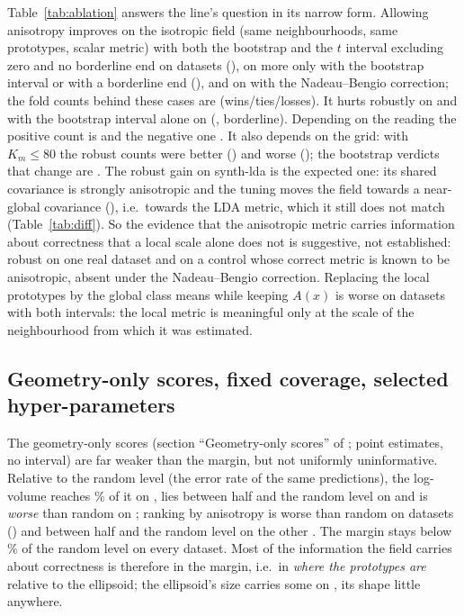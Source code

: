 \documentclass[10pt,a4paper]{article}
\theoremstyle{plain}
\theoremstyle{definition}
\theoremstyle{remark}
\begin{document}
Table~\ref{tab:ablation} answers the line's question in its narrow form. Allowing anisotropy improves on the isotropic field (same neighbourhoods, same prototypes, scalar metric) with both the bootstrap and the $t$ interval excluding zero and no borderline end on \AblAnisoIsoFirstRobust{} datasets (\AblAnisoIsoFirstRobustList), on \AblAnisoIsoFirstWeak{} more only with the bootstrap interval or with a borderline end (\AblAnisoIsoFirstWeakList), and on \AblAnisoIsoFirstNB{} with the Nadeau--Bengio correction; the fold counts behind these cases are \AblAnisoIsoWinsText{} (wins/ties/losses). It hurts robustly on \AblAnisoIsoSecondRobust{} and with the bootstrap interval alone on \AblAnisoIsoSecondWeak{} (\AblAnisoIsoSecondWeakList, borderline). Depending on the reading the positive count is \AblAnisoIsoFirstRange{} and the negative one \AblAnisoIsoSecondRange. It also depends on the grid: with $K_m\le80$ the robust counts were \VTwoAblAnisoIsoFirstRobust{} better (\VTwoAblAnisoIsoFirstRobustList) and \VTwoAblAnisoIsoSecondRobust{} worse (\VTwoAblAnisoIsoSecondRobustList); the bootstrap verdicts that change are \AblChangedList. The robust gain on synth-lda is the expected one: its shared covariance is strongly anisotropic and the tuning moves the field towards a near-global covariance (\SelSlda), i.e.\ towards the LDA metric, which it still does not match (Table~\ref{tab:diff}). So the evidence that the anisotropic metric carries information about correctness that a local scale alone does not is suggestive, not established: robust on one real dataset and on a control whose correct metric is known to be anisotropic, absent under the Nadeau--Bengio correction. Replacing the local prototypes by the global class means while keeping $A(x)$ is worse on \AblAnisoGprotoFirst{} datasets with both intervals: the local metric is meaningful only at the scale of the neighbourhood from which it was estimated.

\subsection{Geometry-only scores, fixed coverage, selected hyper-parameters}

The geometry-only scores (section ``Geometry-only scores'' of ; point estimates, no interval) are far weaker than the margin, but not uniformly uninformative. Relative to the random level (the error rate of the same predictions), the log-volume reaches \GeomVolInformRange\% of it on \GeomVolInformList, lies between half and the random level on \GeomVolBelowList{} and is \emph{worse} than random on \GeomVolAboveRandomList; ranking by anisotropy is worse than random on \GeomAnisAboveRandom{} datasets (\GeomAnisAboveRandomList) and between half and the random level on the other \GeomAnisBelowN. The margin stays below \GeomMarginRatioMax\% of the random level on every dataset. Most of the information the field carries about correctness is therefore in the margin, i.e.\ in \emph{where the prototypes are} relative to the ellipsoid; the ellipsoid's size carries some on \GeomVolInformList, its shape little anywhere.
\end{document}
